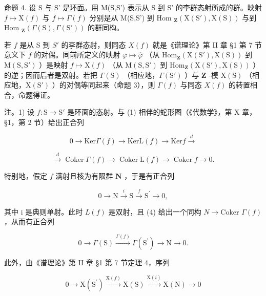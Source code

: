 命题 4. 设 S 与 S' 是环面。用 M(S,S') 表示从 S 到 S' 的李群态射所成的群。映射 \(f \mapsto \mathrm{X}(f)\) 与 \(f \mapsto \Gamma(f)\) 分别是从 M(S,S') 到 Hom \(_{\mathbf{Z}}(\mathrm{X}(\mathrm{S}'),\mathrm{X}(\mathrm{S}))\) 与到 Hom \(_{\mathbf{Z}}(\Gamma(\mathrm{S}),\Gamma(\mathrm{S}'))\) 的群同构。

若 \(f\) 是从 S 到 \(S'\) 的李群态射，则同态 \(X(f)\) 就是《谱理论》第 II 章 §1 第 7 节意义下 \(f\) 的对偶。同前所定义的映射 \(\varphi \mapsto \hat{\varphi}\) （从 \(\mathrm{Hom}_{\mathbf{Z}}(\mathrm{X}(\mathrm{S}'), \mathrm{X}(\mathrm{S}))\) 到 \(\mathrm{M}(\mathrm{S},\mathrm{S}')\) ）是映射 \(f \mapsto \mathrm{X}(f)\) （从 \(\mathrm{M}(\mathrm{S},\mathrm{S}')\) 到 \(\mathrm{Hom}_{\mathbf{Z}}(\mathrm{X}(\mathrm{S}'), \mathrm{X}(\mathrm{S}))\) ）的逆；因而后者是双射。若把 \(\Gamma(\mathrm{S})\) （相应地，\(\Gamma(\mathrm{S}')\) ）与 \(\mathbf{Z}\) -模 \(\mathrm{X}(\mathrm{S})\) （相应地，\(\mathrm{X}(\mathrm{S}')\) ）的对偶等同起来（命题 3），则 \(\Gamma(f)\) 与同态 \(X(f)\) 的转置相合，命题得证。

注。1) 设 \(f: \mathrm{S} \to \mathrm{S}'\) 是环面的态射。与 (1) 相伴的蛇形图（《代数学》，第 X 章，§1，第 2 节）给出正合列

\[
0 \longrightarrow \mathrm{Ker} \Gamma (f) \longrightarrow \mathrm{KerL} (f) \longrightarrow \mathrm{Ker} f \stackrel {d} {\longrightarrow}\tag{4}
\]

\[
\stackrel {{d}} {{\longrightarrow}} \operatorname{Coker} \Gamma (f) \longrightarrow \operatorname{Coker} \mathrm{L} (f) \longrightarrow \operatorname{Coker} f \longrightarrow 0.
\]

特别地，假定 \(f\) 满射且核为有限群 \(\mathbf{N}\) ，于是有正合列

\[
0 \longrightarrow \mathrm{N} \stackrel {i} {\longrightarrow} \mathrm{S} \stackrel {f} {\longrightarrow} \mathrm{S} ^ {\prime} \longrightarrow 0,
\]

其中 i 是典则单射。此时 \(L(f)\) 是双射，且 (4) 给出一个同构 \(N \to \text{Coker } \Gamma(f)\) ，从而有正合列

\[
0 \longrightarrow \Gamma (\mathrm{S}) \stackrel {\Gamma (f)} {\longrightarrow} \Gamma (\mathrm{S} ^ {\prime}) \longrightarrow \mathrm{N} \longrightarrow 0.\tag{5}
\]

此外，由《谱理论》第 II 章 §1 第 7 节定理 4，序列

\[
0 \longrightarrow \mathrm{X} (\mathrm{S} ^ {\prime}) \stackrel {{\mathrm{X} (f)}} {{\longrightarrow}} \mathrm{X} (\mathrm{S}) \stackrel {{\mathrm{X} (i)}} {{\longrightarrow}} \mathrm{X} (\mathrm{N}) \longrightarrow 0\tag{6}
\]

